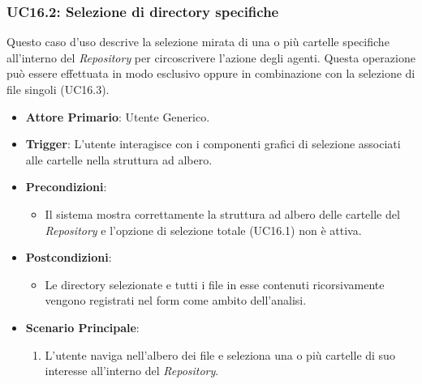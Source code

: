 \documentclass[12pt, a4paper]{article}
\begin{document}
\subsubsection{UC16.2: Selezione di directory specifiche}\label{uc:16.2}
Questo caso d'uso descrive la selezione mirata di una o più cartelle specifiche all'interno del \textit{Repository} per circoscrivere l'azione degli agenti. Questa operazione può essere effettuata in modo esclusivo oppure in combinazione con la selezione di file singoli (UC16.3).
\begin{itemize}
    \item \textbf{Attore Primario}: Utente Generico.
    \item \textbf{Trigger}: L'utente interagisce con i componenti grafici di selezione associati alle cartelle nella struttura ad albero.
    \item \textbf{Precondizioni}:\begin{itemize}\item Il sistema mostra correttamente la struttura ad albero delle cartelle del \textit{Repository} e l'opzione di selezione totale (UC16.1) non è attiva.\end{itemize}
    \item \textbf{Postcondizioni}:\begin{itemize}\item Le directory selezionate e tutti i file in esse contenuti ricorsivamente vengono registrati nel form come ambito dell'analisi.\end{itemize}
    \item \textbf{Scenario Principale}:
    \begin{enumerate}
        \item L'utente naviga nell'albero dei file e seleziona una o più cartelle di suo interesse all'interno del \textit{Repository}.
    \end{enumerate}
\end{itemize}
\end{document}
